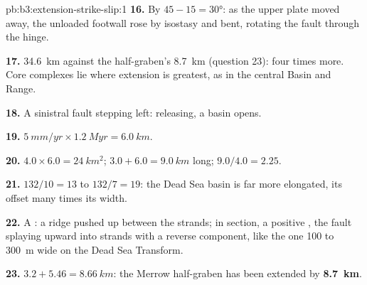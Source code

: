 \begin{solution}{pb:b3:extension-strike-slip:1}
\textbf{16.} By $45 - 15 = \ang{30}$: as the upper plate moved away, the
unloaded footwall rose by isostasy and bent, rotating the fault through the
hinge.

\textbf{17.} \qty{34.6}{km} against the half-graben's \qty{8.7}{km} (question
23): four times more. Core complexes lie where extension is greatest, as in
the central Basin and Range.

\textbf{18.} A sinistral fault stepping left: releasing, a basin opens.

\textbf{19.} $\qty{5}{mm/yr}\times\qty{1.2}{Myr} = \qty{6.0}{km}$.

\textbf{20.} $4.0\times6.0 = \qty{24}{km^2}$; $3.0 + 6.0 = \qty{9.0}{km}$ long;
$9.0/4.0 = 2.25$.

\textbf{21.} $132/10 = 13$ to $132/7 = 19$: the Dead Sea basin is far more
elongated, its offset many times its width.

\textbf{22.} A : a ridge pushed up between the strands; in
section, a positive , the fault splaying upward into strands
with a reverse component, like the one 100 to \qty{300}{m} wide on the Dead
Sea Transform.

\textbf{23.} $3.2 + 5.46 = \qty{8.66}{km}$: the Merrow half-graben has been
extended by \textbf{\qty[text-series-to-math=true]{8.7}{km}}.
\end{solution}
